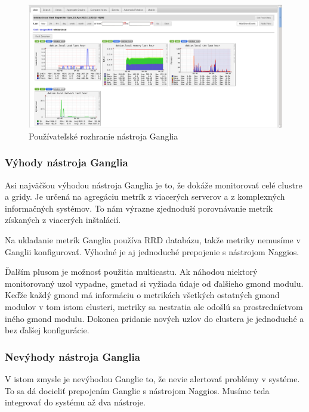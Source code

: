 \documentclass[a4paper, usesections, upjsfrontpage, thesismargins, thesislinespacing]{rnthesis}
\begin{document}
\begin{figure}
	\begin{center}
		\includegraphics[scale=0.41]{ganglia.png}
	\end{center}
	\caption{Používateľské rozhranie nástroja Ganglia}
\end{figure}

\subsubsection{Výhody nástroja Ganglia}

Asi najväčšou výhodou nástroja Ganglia je to, že dokáže monitorovať celé clustre a gridy.
Je určená na agregáciu metrík z viacerých serverov a z komplexných informačných systémov.
To nám výrazne zjednoduší porovnávanie metrík získaných z viacerých inštalácií.

Na ukladanie metrík Ganglia používa RRD databázu, takže metriky nemusíme v Ganglii konfigurovať.
Výhodné je aj jednoduché prepojenie s nástrojom Naggios.

Ďalším plusom je možnosť použitia multicastu.
Ak náhodou niektorý monitorovaný uzol vypadne, gmetad si vyžiada údaje od ďalšieho gmond modulu.
Keďže každý gmond má informáciu o metrikách všetkých ostatných gmond modulov v tom istom clusteri,
metriky sa nestratia ale odošlú sa prostredníctvom iného gmond modulu. 
Dokonca pridanie nových uzlov do clustera je jednoduché a bez ďalšej konfigurácie.

\subsubsection{Nevýhody nástroja Ganglia}

V istom zmysle je nevýhodou Ganglie to, že nevie alertovať problémy v systéme.
To sa dá docieliť prepojením Ganglie s nástrojom Naggios.
Musíme teda integrovať do systému až dva nástroje.
\end{document}
